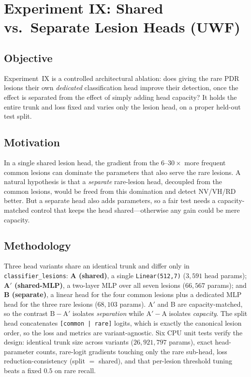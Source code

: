 \documentclass[journal,twoside,web]{ieeecolor}
\begin{document}
\section{Experiment IX: Shared vs.\ Separate Lesion Heads (UWF)}
\label{sec:exp9}

\subsection{Objective}
Experiment~IX is a controlled architectural ablation: does giving the rare
PDR lesions their own \emph{dedicated} classification head improve their detection,
once the effect is separated from the effect of simply adding head capacity? It
holds the entire trunk and loss fixed and varies only the lesion head, on a proper
held-out test split.

\subsection{Motivation}
In a single shared lesion head, the gradient from the $6$--$30\times$ more frequent
common lesions can dominate the parameters that also serve the rare lesions. A
natural hypothesis is that a \emph{separate} rare-lesion head, decoupled from the
common lesions, would be freed from this domination and detect NV/VH/RD better. But
a separate head also adds parameters, so a fair test needs a capacity-matched
control that keeps the head shared---otherwise any gain could be mere capacity.

\subsection{Methodology}
Three head variants share an identical trunk and differ only in
\texttt{classifier\_lesions}: \textbf{A (shared)}, a single \texttt{Linear(512,7)}
($3{,}591$ head params); \textbf{A$'$ (shared-MLP)}, a two-layer MLP over all seven
lesions ($66{,}567$ params); and \textbf{B (separate)}, a linear head for the four
common lesions plus a dedicated MLP head for the three rare lesions ($68{,}103$
params). A$'$ and B are capacity-matched, so the contrast $\text{B}-\text{A}'$
isolates \emph{separation} while $\text{A}'-\text{A}$ isolates \emph{capacity}. The
split head concatenates \texttt{[common\,|\,rare]} logits, which is exactly the
canonical lesion order, so the loss and metrics are variant-agnostic. Six CPU
unit tests verify the design: identical trunk size across variants
($26{,}921{,}797$ params), exact head-parameter counts, rare-logit gradients
touching only the rare sub-head, loss reduction-consistency (split $=$ shared), and
that per-lesion threshold tuning beats a fixed $0.5$ on rare recall.
\end{document}
